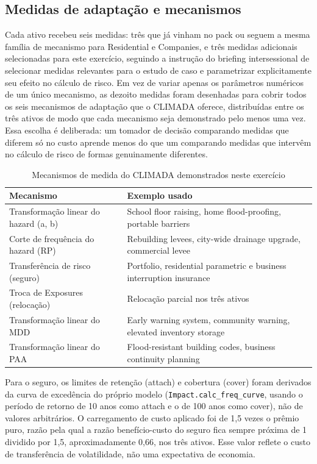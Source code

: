 \documentclass[11pt]{article}
\begin{document}
\subsection{Medidas de adaptação e mecanismos}

Cada ativo recebeu seis medidas: três que já vinham no pack ou seguem a mesma família de
mecanismo para Residential e Companies, e três medidas adicionais selecionadas para este
exercício, seguindo a instrução do briefing intersessional de selecionar medidas
relevantes para o estudo de caso e parametrizar explicitamente seu efeito no cálculo de
risco. Em vez de variar apenas os parâmetros numéricos de um único mecanismo, as dezoito
medidas foram desenhadas para cobrir todos os seis mecanismos de adaptação que o CLIMADA
oferece, distribuídas entre os três ativos de modo que cada mecanismo seja demonstrado
pelo menos uma vez. Essa escolha é deliberada: um tomador de decisão comparando medidas
que diferem só no custo aprende menos do que um comparando medidas que intervêm no
cálculo de risco de formas genuinamente diferentes.

\begin{table}[H]
\centering
\caption{Mecanismos de medida do CLIMADA demonstrados neste exercício}
\label{tab:mecanismos}
\begin{tabular}{p{5cm}p{8cm}}
\toprule
Mecanismo & Exemplo usado \\
\midrule
Transformação linear do hazard (a, b) & School floor raising, home flood-proofing, portable barriers \\
Corte de frequência do hazard (RP) & Rebuilding levees, city-wide drainage upgrade, commercial levee \\
Transferência de risco (seguro) & Portfolio, residential parametric e business interruption insurance \\
Troca de Exposures (relocação) & Relocação parcial nos três ativos \\
Transformação linear do MDD & Early warning system, community warning, elevated inventory storage \\
Transformação linear do PAA & Flood-resistant building codes, business continuity planning \\
\bottomrule
\end{tabular}
\end{table}

Para o seguro, os limites de retenção (attach) e cobertura (cover) foram derivados da
curva de excedência do próprio modelo (\texttt{Impact.calc\_freq\_curve}, usando o período
de retorno de 10 anos como attach e o de 100 anos como cover), não de valores arbitrários.
O carregamento de custo aplicado foi de 1,5 vezes o prêmio puro, razão pela qual a razão
benefício-custo do seguro fica sempre próxima de 1 dividido por 1,5, aproximadamente 0,66,
nos três ativos. Esse valor reflete o custo de transferência de volatilidade, não uma
expectativa de economia.
\end{document}
